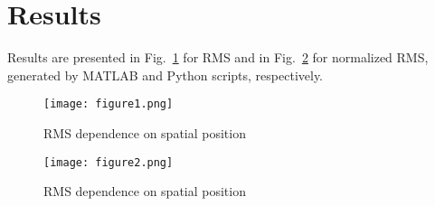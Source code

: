 \section{Results}
Results are presented in Fig.~\ref{fig:rms} for RMS and in Fig.~\ref{fig:rms_norm} for normalized RMS, generated by MATLAB and Python scripts, respectively.
	
\begin{figure}[ht!]
	\centering
	\texttt{[image: figure1.png]}
	\caption{RMS dependence on spatial position}
	\label{fig:rms}
\end{figure}
\begin{figure}[ht!]
	\centering
	\texttt{[image: figure2.png]}
	\caption{RMS dependence on spatial position}
	\label{fig:rms_norm}
\end{figure}
\clearpage
